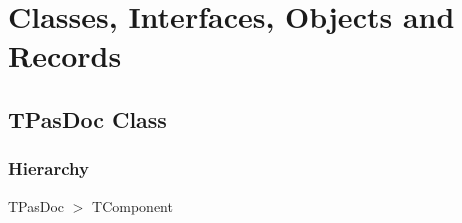 \documentclass{report}
\newif\ifpdf
\begin{document}
\section{Classes, Interfaces, Objects and Records}
\ifpdf
\subsection*{\large{\textbf{TPasDoc Class}}\normalsize\hspace{1ex}\hrulefill}
\else
\subsection*{TPasDoc Class}
\fi
\label{PasDoc_Base.TPasDoc}
\subsubsection*{\large{\textbf{Hierarchy}}\normalsize\hspace{1ex}\hfill}
TPasDoc {$>$} TComponent
\end{document}
